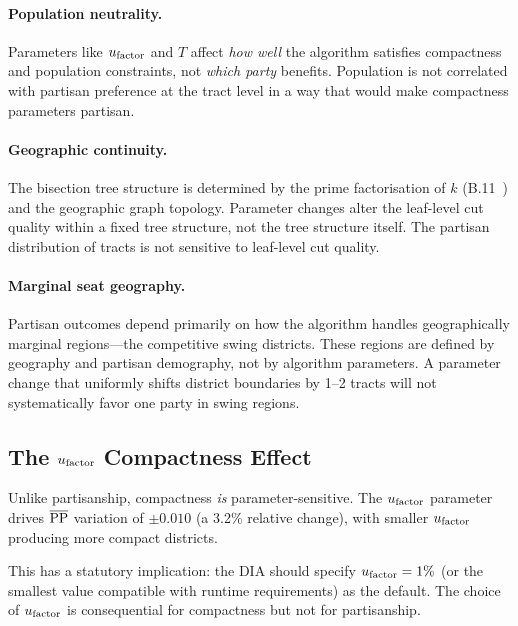 \paragraph{Population neutrality.}
Parameters like $u_{\mathrm{factor}}$ and $T$ affect \emph{how well} the algorithm
satisfies compactness and population constraints, not \emph{which party}
benefits.
Population is not correlated with partisan preference at the tract level
in a way that would make compactness parameters partisan.

\paragraph{Geographic continuity.}
The bisection tree structure is determined by the prime factorisation of $k$
(B.11~\citep{b11paper}) and the geographic graph topology.
Parameter changes alter the leaf-level cut quality within a fixed tree structure,
not the tree structure itself.
The partisan distribution of tracts is not sensitive to leaf-level cut quality.

\paragraph{Marginal seat geography.}
Partisan outcomes depend primarily on how the algorithm handles
geographically marginal regions---the competitive swing districts.
These regions are defined by geography and partisan demography, not by
algorithm parameters.
A parameter change that uniformly shifts district boundaries by 1--2 tracts
will not systematically favor one party in swing regions.

\subsection{The $u_{\mathrm{factor}}$ Compactness Effect}

Unlike partisanship, compactness \emph{is} parameter-sensitive.
The $u_{\mathrm{factor}}$ parameter drives $\overline{\mathrm{PP}}$ variation of $\pm 0.010$
(a 3.2\% relative change), with smaller $u_{\mathrm{factor}}$ producing more compact
districts.

This has a statutory implication: the DIA should specify $u_{\mathrm{factor}} = 1\%$
(or the smallest value compatible with runtime requirements) as the default.
The choice of $u_{\mathrm{factor}}$ is consequential for compactness but not for
partisanship.
